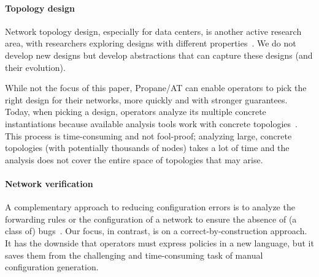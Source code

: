 \documentclass[numbers, 10pt, preprint]{sigplanconf}
\newcommand{\sysname}{{\text{}\small \sf Propane/AT}\xspace}
\newcommand{\para}[1]{\paragraph*{\textbf{#1}}}
\begin{document}
\para{Topology design} Network topology design, especially for data centers, is another active research area, with researchers exploring designs with different properties~\cite{fattree,facebook-fattree,f10-fattree,vl2-fattree,bcube,dcell,hyperx,butterfly}. We do not develop new designs but develop abstractions that can capture these designs (and their evolution).

While not the focus of this paper, \sysname can enable operators to pick the right design for their networks, more quickly and with stronger guarantees. Today, when picking a design, operators analyze its multiple concrete instantiations because available analysis tools work with concrete topologies~\cite{condor}. This process is time-consuming and not fool-proof; analyzing large, concrete topologies (with potentially thousands of nodes) takes a lot of time and the analysis does not cover the entire space of topologies that may arise.

\para{Network verification}
A complementary approach to reducing configuration errors is to analyze the forwarding rules or the configuration of a network to ensure the absence of (a class of) bugs~\cite{anteater,hsa,veriflow,feamster+:rcc,ipassure,batfish,bagpipe,arc,era,surgery,coalgebraic}. Our focus, in contrast, is on a correct-by-construction approach. It has the downside that operators must express policies in a new language, but it saves them from the challenging and time-consuming task of manual configuration generation.


\end{document}
